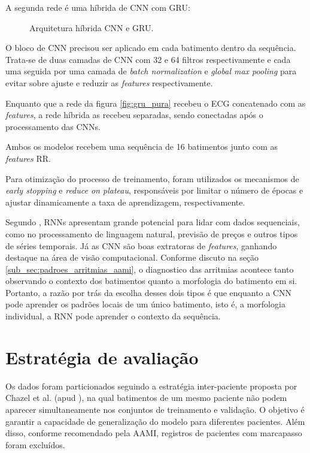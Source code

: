 A segunda rede é uma híbrida de CNN com GRU:

\begin{figure}[H]
  \centering
  \caption{Arquitetura híbrida CNN e GRU.}
  \label{fig:cnn_gru}
\end{figure}

O bloco de CNN precisou ser aplicado em cada batimento dentro da sequência. Trata-se de duas camadas de CNN com 32 e 64 filtros respectivamente e cada 
uma seguida por uma camada de \textit{batch normalization} e \textit{global max pooling} para evitar sobre ajuste e reduzir as \textit{features} respectivamente.

Enquanto que a rede da figura \ref{fig:gru_pura} recebeu o ECG concatenado com as \textit{features}, a rede híbrida as recebeu separadas, sendo conectadas após o processamento
das CNNs.

Ambos os modelos recebem uma sequência de 16 batimentos junto com as \textit{features} RR.

Para otimização do processo de treinamento, foram utilizados os mecanismos de \textit{early stopping} e \textit{reduce on plateau}, responsáveis por limitar o número de épocas e ajustar dinamicamente a taxa de aprendizagem, respectivamente.

Segundo , RNNs apresentam grande potencial para lidar com dados sequenciais, como no processamento de linguagem natural, previsão de preços e outros tipos de séries temporais. Já as CNN são boas extratoras de \textit{features}, ganhando destaque na área 
de visão computacional. Conforme discuto na seção \ref{sub_sec:padroes_arritmias_aami}, o diagnostico das arritmias acontece tanto observando o contexto dos batimentos quanto 
a morfologia do batimento em si. Portanto, a razão por trás da escolha desses dois tipos é que enquanto a CNN pode aprender os padrões locais de um único batimento, isto é, a morfologia individual, 
a RNN pode aprender o contexto da sequência.

\section{Estratégia de avaliação}

Os dados foram particionados seguindo a estratégia inter-paciente proposta por Chazel et al. (apud ), na qual batimentos de um mesmo paciente não podem aparecer simultaneamente nos conjuntos de treinamento e validação. 
O objetivo é garantir a capacidade de generalização do modelo para diferentes pacientes. 
Além disso, conforme recomendado pela AAMI, registros de pacientes com marcapasso foram excluídos.

